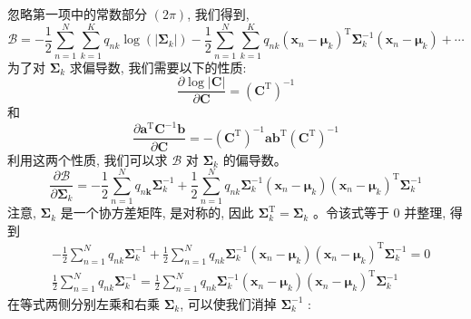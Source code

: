 \documentclass[UTF8]{ctexart}
\begin{document}
忽略第一项中的常数部分 $(2 \pi)$, 我们得到,
\begin{equation}
    \mathcal{B}=-\frac{1}{2} \sum_{n=1}^{N} \sum_{k=1}^{K} q_{n k} \log \left(\left|\boldsymbol{\Sigma}_{k}\right|\right)-\frac{1}{2} \sum_{n=1}^{N} \sum_{k=1}^{K} q_{n k}\left(\boldsymbol{x}_{n}-\boldsymbol{\mu}_{k}\right)^{\mathrm{T}} \boldsymbol{\Sigma}_{k}^{-1}\left(\boldsymbol{x}_{n}-\boldsymbol{\mu}_{k}\right)+\cdots 
\end{equation}
为了对 $\boldsymbol{\Sigma}_{k}$ 求偏导数, 我们需要以下的性质:
\begin{equation}
    \frac{\partial \log |\boldsymbol{C}|}{\partial \boldsymbol{C}}=\left(\boldsymbol{C}^{\mathrm{T}}\right)^{-1}  
\end{equation}
和
\begin{equation}
    \frac{\partial \boldsymbol{a}^{\mathrm{T}} \boldsymbol{C}^{-1} \boldsymbol{b}}{\partial \boldsymbol{C}}=-\left(\boldsymbol{C}^{\mathrm{T}}\right)^{-1} \boldsymbol{a} \boldsymbol{b}^{\mathrm{T}}\left(\boldsymbol{C}^{\mathrm{T}}\right)^{-1}    
\end{equation}
利用这两个性质, 我们可以求 $\mathcal{B}$ 对 $\boldsymbol{\Sigma}_{k}$ 的偏导数。
\begin{equation}
    \frac{\partial \mathcal{B}}{\partial \boldsymbol{\Sigma}_{k}}=-\frac{1}{2} \sum_{n=1}^{N} q_{n \boldsymbol{k}} \boldsymbol{\Sigma}_{k}^{-1}+\frac{1}{2} \sum_{n=1}^{N} q_{n k} \boldsymbol{\Sigma}_{k}^{-1}\left(\boldsymbol{x}_{n}-\boldsymbol{\mu}_{k}\right)\left(\boldsymbol{x}_{n}-\boldsymbol{\mu}_{k}\right)^{\mathrm{T}} \boldsymbol{\Sigma}_{k}^{-1}    
\end{equation}
注意, $\boldsymbol{\Sigma}_{k}$ 是一个协方差矩阵, 是对称的, 
因此 $\boldsymbol{\Sigma}_{k}^{\mathrm{T}}=\boldsymbol{\Sigma}_{k}$ 。令该式等于 0 并整理, 得到
$$
\begin{aligned}
&-\frac{1}{2} \sum_{n=1}^{N} q_{n k} \boldsymbol{\Sigma}_{k}^{-1}+\frac{1}{2} \sum_{n=1}^{N} q_{n k} \boldsymbol{\Sigma}_{k}^{-1}\left(\boldsymbol{x}_{n}-\boldsymbol{\mu}_{k}\right)\left(\boldsymbol{x}_{n}-\boldsymbol{\mu}_{k}\right)^{\mathrm{T}} \boldsymbol{\Sigma}_{k}^{-1}=0 \\
&\frac{1}{2} \sum_{n=1}^{N} q_{n k} \boldsymbol{\Sigma}_{k}^{-1}=\frac{1}{2} \sum_{n=1}^{N} q_{n k} \boldsymbol{\Sigma}_{k}^{-1}\left(\boldsymbol{x}_{n}-\boldsymbol{\mu}_{k}\right)\left(\boldsymbol{x}_{n}-\boldsymbol{\mu}_{k}\right)^{\mathrm{T}} \boldsymbol{\Sigma}_{k}^{-1}
\end{aligned}
$$
在等式两侧分别左乘和右乘 $\boldsymbol{\Sigma}_{k}$, 可以使我们消掉 $\boldsymbol{\Sigma}_{k}^{-1}$ :
\end{document}
